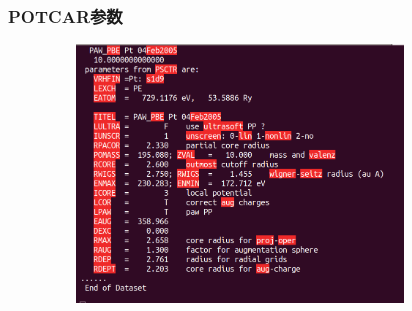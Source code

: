 \frame
{
	\frametitle{\textrm{POTCAR}参数}
\begin{figure}[h!]
\centering
\includegraphics[height=2.7in,width=4.0in,viewport=0 15 780 528,clip]{Figures/Pt_atom-POTCAR.png}
\caption{\fontsize{6.2pt}{5.2pt}}%
\label{Pt_atom:POTCAR}
\end{figure}
}
